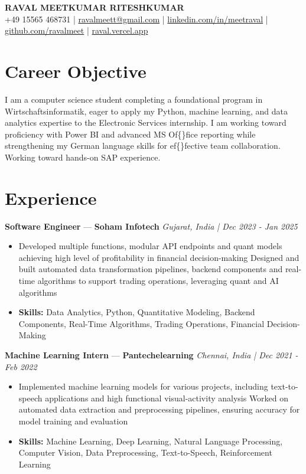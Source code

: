 \documentclass[a4paper,10pt]{article}
\begin{document}
\begin{center}
  {\Large\bfseries RAVAL MEETKUMAR RITESHKUMAR}\\[2pt]
  {\small +49 15565 468731 \;|\; \href{mailto:ravalmeett@gmail.com}{ravalmeett@gmail.com} \;|\; \href{https://www.linkedin.com/in/meetraval/}{linkedin.com/in/meetraval} \;|\; \href{https://github.com/ravalmeet}{github.com/ravalmeet} \;|\; \href{https://raval.vercel.app/}{raval.vercel.app}}
\end{center}
\vspace{-3pt}

\section*{Career Objective}
I am a computer science student completing a foundational program in Wirtschaftsinformatik, eager to apply my Python, machine learning, and data analytics expertise to the Electronic Services internship. I am working toward proficiency with Power BI and advanced MS Of\{\}fice reporting while strengthening my German language skills for ef\{\}fective team collaboration. Working toward hands-on SAP experience.\par

\section*{Experience}
\textbf{Software Engineer} — \textbf{Soham Infotech} \hfill \textit{Gujarat, India \;|\; Dec 2023 - Jan 2025}\par
\vspace{1pt}
\begin{itemize}
  \item Developed multiple functions, modular API endpoints and quant models achieving high level of profitability in financial decision-making Designed and built automated data transformation pipelines, backend components and real-time algorithms to support trading operations, leveraging quant and AI algorithms
  \item \textbf{Skills:} Data Analytics, Python, Quantitative Modeling, Backend Components, Real-Time Algorithms, Trading Operations, Financial Decision-Making
\end{itemize}
\vspace{3pt}
\textbf{Machine Learning Intern} — \textbf{Pantechelearning} \hfill \textit{Chennai, India \;|\; Dec 2021 - Feb 2022}\par
\vspace{1pt}
\begin{itemize}
  \item Implemented machine learning models for various projects, including text-to-speech applications and high functional visual-activity analysis Worked on automated data extraction and preprocessing pipelines, ensuring accuracy for model training and evaluation
  \item \textbf{Skills:} Machine Learning, Deep Learning, Natural Language Processing, Computer Vision, Data Preprocessing, Text-to-Speech, Reinforcement Learning
\end{itemize}
\end{document}
